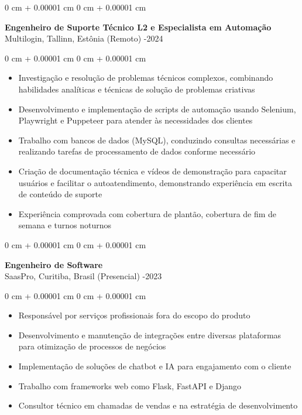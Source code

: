 \documentclass[10pt, letterpaper]{article}
\newenvironment{highlights}{
    \begin{itemize}[
        topsep=0.10 cm,
        parsep=0.10 cm,
        partopsep=0pt,
        itemsep=0pt,
        leftmargin=0 cm + 10pt
    ]
}{
    \end{itemize}
}
\newenvironment{onecolentry}{
    \begin{adjustwidth}{
        0 cm + 0.00001 cm
    }{
        0 cm + 0.00001 cm
    }
}{
    \end{adjustwidth}
}
\begin{document}
\begin{onecolentry}
    \setcolumnwidth{\fill, 4.5cm}
    \begin{paracol}{2}
        \textbf{Engenheiro de Suporte Técnico L2 e Especialista em Automação} \\ Multilogin, Tallinn, Estônia (Remoto)
        \switchcolumn
        -2024
    \end{paracol}
\end{onecolentry}
\vspace{0.10cm}
\begin{onecolentry}
    \begin{highlights}
                \item Investigação e resolução de problemas técnicos complexos, combinando habilidades analíticas e técnicas de solução de problemas criativas
                \item Desenvolvimento e implementação de scripts de automação usando Selenium, Playwright e Puppeteer para atender às necessidades dos clientes
                \item Trabalho com bancos de dados (MySQL), conduzindo consultas necessárias e realizando tarefas de processamento de dados conforme necessário
                \item Criação de documentação técnica e vídeos de demonstração para capacitar usuários e facilitar o autoatendimento, demonstrando experiência em escrita de conteúdo de suporte
                \item Experiência comprovada com cobertura de plantão, cobertura de fim de semana e turnos noturnos
    \end{highlights}
\end{onecolentry}

\vspace{0.2cm}

\begin{onecolentry}
    \setcolumnwidth{\fill, 4.5cm}
    \begin{paracol}{2}
        \textbf{Engenheiro de Software} \\ SaasPro, Curitiba, Brasil (Presencial)
        \switchcolumn
        -2023
    \end{paracol}
\end{onecolentry}
\vspace{0.10cm}
\begin{onecolentry}
    \begin{highlights}
                \item Responsável por serviços profissionais fora do escopo do produto
                \item Desenvolvimento e manutenção de integrações entre diversas plataformas para otimização de processos de negócios
                \item Implementação de soluções de chatbot e IA para engajamento com o cliente
                \item Trabalho com frameworks web como Flask, FastAPI e Django
                \item Consultor técnico em chamadas de vendas e na estratégia de desenvolvimento
    \end{highlights}
\end{onecolentry}
\end{document}
